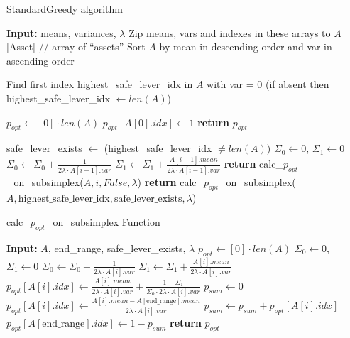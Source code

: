 \begin{algorithm}
\caption{StandardGreedy algorithm}
\label{lst:theory_standardgreedy_def}
\begin{algorithmic}[1]
\STATE \textbf{Input:} means, variances, $\lambda$
\STATE Zip means, vars and indexes in these arrays to $A$[Asset] // array of ``assets''
\STATE Sort $A$ by mean in descending order and var in ascending order

\STATE Find first index highest\_safe\_lever\_idx in $A$ with var = 0 (if absent then highest\_safe\_lever\_idx $\gets len(A)$)

    \STATE $p_{opt} \gets [0] \cdot len(A)$
    \STATE $p_{opt}[A[0].idx] \gets 1$
    \STATE \textbf{return} $p_{opt}$
\ENDIF

\STATE safe\_lever\_exists $\gets$ (highest\_safe\_lever\_idx $ \neq len(A)$)
\STATE $\Sigma_0 \gets 0$,  $\Sigma_1 \gets 0$
    \STATE $\Sigma_0 \gets \Sigma_0 + \frac{1}{2 \lambda \cdot A[i - 1].var}$
    \STATE $\Sigma_1 \gets \Sigma_1 + \frac{A[i - 1].mean}{2 \lambda \cdot A[i - 1].var}$
        \STATE \textbf{return} calc\_$p_{opt}$\_on\_subsimplex($A, i, False, \lambda$)
    \ENDIF
\ENDFOR
\STATE \textbf{return} calc\_$p_{opt}$\_on\_subsimplex($A, \text{highest\_safe\_lever\_idx}, \text{safe\_lever\_exists}, \lambda$)
\end{algorithmic}
\end{algorithm}

\begin{algorithm}
\caption{calc\_$p_{opt}$\_on\_subsimplex Function}
\label{lst:theory_calc_opt_probs_on_subsimplex_def}
\begin{algorithmic}[1]
\STATE \textbf{Input:} $A$, end\_range, safe\_lever\_exists, $\lambda$
\STATE $p_{opt} \gets [0] \cdot len(A)$
\STATE $\Sigma_0 \gets 0$,  $\Sigma_1 \gets 0$
        \STATE $\Sigma_0 \gets \Sigma_0 + \frac{1}{2 \lambda \cdot A[i].var}$
        \STATE $\Sigma_1 \gets \Sigma_1 + \frac{A[i].mean}{2 \lambda \cdot A[i].var}$
    \ENDFOR
        \STATE $p_{opt}[A[i].idx] \gets \frac{A[i].mean}{2 \lambda \cdot A[i].var} + \frac{1 - \Sigma_1}{\Sigma_0 \cdot 2 \lambda \cdot A[i].var}$
    \ENDFOR
\ELSE
    \STATE $p_{sum} \gets 0$
        \STATE $p_{opt}[A[i].idx] \gets \frac{A[i].mean - A[\text{end\_range}].mean}{2 \lambda \cdot A[i].var}$
        \STATE $p_{sum} \gets p_{sum} + p_{opt}[A[i].idx]$
    \ENDFOR
    \STATE $p_{opt}[A[\text{end\_range}].idx] \gets 1 - p_{sum}$
\ENDIF
\STATE \textbf{return} $p_{opt}$
\end{algorithmic}
\end{algorithm}

